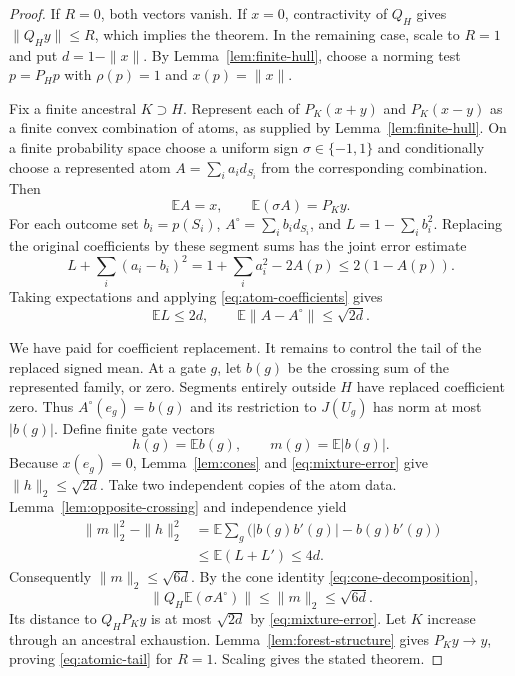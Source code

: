 \begin{proof}
If $R=0$, both vectors vanish. If $x=0$, contractivity of $Q_H$ gives
$\|Q_Hy\|\le R$, which implies the theorem. In the remaining case,
scale to $R=1$ and put $d=1-\|x\|$. By
Lemma~\ref{lem:finite-hull}, choose a norming test $p=P_Hp$ with
$\rho(p)=1$ and $x(p)=\|x\|$.

Fix a finite ancestral $K\supset H$. Represent each of
$P_K(x+y)$ and $P_K(x-y)$ as a finite convex combination of atoms,
as supplied by Lemma~\ref{lem:finite-hull}. On a finite probability
space choose a uniform sign $\sigma\in\{-1,1\}$ and conditionally
choose a represented atom $A=\sum_i a_i d_{S_i}$ from the corresponding
combination. Then
\[
 \mathbb EA=x,\qquad\mathbb E(\sigma A)=P_Ky.
\]
For each outcome set $b_i=p(S_i)$, $A^\circ=\sum_i b_i d_{S_i}$,
and $L=1-\sum_i b_i^2$. Replacing the original coefficients by these
segment sums has the joint error estimate
\[
 L+\sum_i(a_i-b_i)^2
 =1+\sum_i a_i^2-2A(p)\le2(1-A(p)).
\]
Taking expectations and applying \eqref{eq:atom-coefficients} gives
\begin{equation}\label{eq:mixture-error}
 \mathbb EL\le2d,\qquad
 \mathbb E\|A-A^\circ\|\le\sqrt{2d}.
\end{equation}

We have paid for coefficient replacement. It remains to control the
tail of the replaced signed mean. At a gate $g$, let $b(g)$ be the
crossing sum of the represented family, or zero. Segments entirely
outside $H$ have replaced coefficient zero. Thus
$A^\circ(e_g)=b(g)$ and its restriction to $J(U_g)$ has norm at most
$|b(g)|$. Define finite gate vectors
\[
 h(g)=\mathbb Eb(g),\qquad m(g)=\mathbb E|b(g)|.
\]
Because $x(e_g)=0$, Lemma~\ref{lem:cones} and
\eqref{eq:mixture-error} give $\|h\|_2\le\sqrt{2d}$.
Take two independent copies of the atom data. Lemma~\ref{lem:opposite-crossing}
and independence yield
\[
 \begin{split}
 \|m\|_2^2-\|h\|_2^2
 &=\mathbb E\sum_g\bigl(|b(g)b'(g)|-b(g)b'(g)\bigr)\\
 &\le\mathbb E(L+L')\le4d.
 \end{split}
\]
Consequently $\|m\|_2\le\sqrt{6d}$. By the cone identity
\eqref{eq:cone-decomposition},
\[
 \|Q_H\mathbb E(\sigma A^\circ)\|\le\|m\|_2\le\sqrt{6d}.
\]
Its distance to $Q_HP_Ky$ is at most $\sqrt{2d}$ by
\eqref{eq:mixture-error}. Let $K$ increase through an ancestral
exhaustion. Lemma~\ref{lem:forest-structure} gives $P_Ky\to y$, proving
\eqref{eq:atomic-tail} for $R=1$. Scaling gives the stated theorem.
\end{proof}

